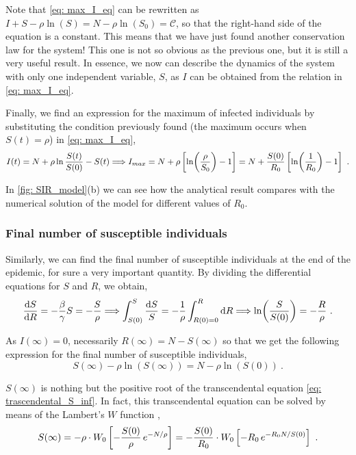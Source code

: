 Note that \cref{eq: max_I_eq} can be rewritten as
$I+S-\rho\ln(S)=N-\rho\ln(S_0)=\mathcal{C}$, so that the right-hand side of the
equation is a constant. This means that we have just found another conservation
law for the system! This one is not so obvious as the previous one, but it is
still a very useful result. In essence, we now can describe the dynamics of the
system with only one independent variable, $S$, as $I$ can be obtained from the
relation in \cref{eq: max_I_eq}.

Finally, we find an expression for the maximum of infected individuals by
substituting the condition previously found (the maximum occurs when
$S(t)=\rho$)
in \cref{eq:  max_I_eq},
\begin{equation}
  I(t)=N+\rho\ln{\frac{S(t)}{S(0)}}-S(t) \Longrightarrow
  I_{max}=N+\rho\claudator{\ln(\frac{\rho}{S_0}) -
    1}=N+\frac{S(0)}{R_0}\claudator{\ln(\frac{1}{R_0}) - 1} \ .
\end{equation}

In \cref{fig: SIR_model}(b) we can see how the analytical result compares with
the numerical solution of the model for different values of $R_0$.

\subsubsection*{Final number of susceptible individuals}

Similarly, we can find the final number of susceptible individuals at the end
of
the epidemic, for sure a very important quantity. By dividing the
differential
equations for $S$ and $R$, we obtain,
\begin{equation*}
  \frac{\mathrm{d} S}{\mathrm{d} R} = -\frac{\beta}{\gamma}S=-\frac{S}{\rho}
  \Longrightarrow\int_{S(0)}^S\frac{\mathrm{d}
    S}{S}=-\frac{1}{\rho}\int_{R(0)=0}^R\mathrm{d}
  R\Longrightarrow\ln(\frac{S}{S(0)})=-\frac{R}{\rho} \ .
\end{equation*}

As $I(\infty)=0$, necessarily $R(\infty)=N-S(\infty)$ so that we get the
following expression for the final number of susceptible individuals,
\begin{equation}\label{eq: trascendental_S_inf}
  S(\infty) - \rho\ln(S(\infty))=N-\rho\ln(S(0)) \ .
\end{equation}

$S(\infty)$ is nothing but the positive root of the transcendental equation
\cref{eq: trascendental_S_inf}. In fact, this transcendental equation can be
solved by means of the Lambert's $W$ function \cite{Lethonen2016},
\begin{equation}
  S(\infty)=-\rho\cdot W_0\left[-\frac{S(0)}{\rho} \,
    e^{-N/\rho}\right]=-\frac{S(0)}{R_0}\cdot W_0\left[-R_0 \, e^{-R_0N/S(0)}\right] \
  .
\end{equation}


